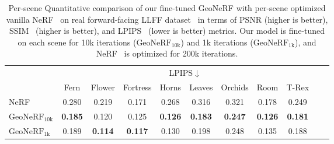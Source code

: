 \begin{table}[!t]
    \begin{center}
        \begin{threeparttable}
            \begin{tabular}{l|cccccccccc}
            & \multicolumn{8}{c}{LPIPS$\downarrow$} \\
            &  Fern & Flower & Fortress & Horns & Leaves & Orchids & Room & T-Rex \\
            \hline
            NeRF & 0.280 & 0.219 & 0.171 & 0.268 & 0.316 & 0.321 & 0.178 & 0.249 \\
            $\text{GeoNeRF}_{\text{10k}}$ & \textbf{0.185} & 0.120 & 0.125 & \textbf{0.126} & \textbf{0.183} & \textbf{0.247} & \textbf{0.126} & \textbf{0.181} \\
            $\text{GeoNeRF}_{\text{1k}}$ & 0.189 & \textbf{0.114} & \textbf{0.117} & 0.130 & 0.198 & 0.248 & 0.135 & 0.188 \\            
            \hline
            \end{tabular}
        \end{threeparttable}
    \end{center}
    \vspace{3.0ex}
    \caption{Per-scene Quantitative comparison of our fine-tuned GeoNeRF with per-scene optimized vanilla NeRF~\citep{mildenhall2020nerf} on real forward-facing LLFF dataset~\citep{mildenhall2019llff} in terms of PSNR (higher is better), SSIM~\citep{wang2004image} (higher is better), and LPIPS~\citep{zhang2018unreasonable} (lower is better) metrics. Our model is fine-tuned on each scene for 10k iterations ($\text{GeoNeRF}_{\text{10k}}$) and 1k iterations ($\text{GeoNeRF}_{\text{1k}}$), and NeRF~\citep{mildenhall2020nerf} is optimized for 200k iterations.}
    \label{table:per_scene_ft_llff}
\end{table}


\clearpage

